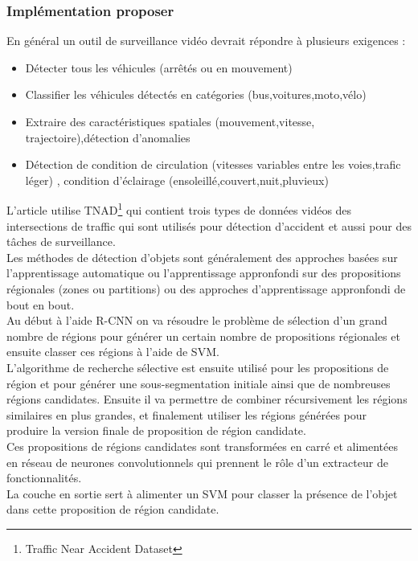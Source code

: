 \documentclass[french,a4paper,11pt,oneside]{article}
\begin{document}
{{ 	 		\subsubsection{Implémentation proposer}{
 	 			En général un outil de surveillance vidéo devrait répondre à plusieurs exigences : \\
 	 			\begin{itemize}
 	 				\item Détecter tous les véhicules (arrêtés ou en mouvement)
 	 				\item Classifier les véhicules détectés en catégories (bus,voitures,moto,vélo)
 	 				\item Extraire des caractéristiques spatiales (mouvement,vitesse, trajectoire),détection d'anomalies
 	 				\item Détection de condition de circulation (vitesses variables entre les voies,trafic léger) , condition d'éclairage (ensoleillé,couvert,nuit,pluvieux)
 	 			\end{itemize}
  				L'article utilise TNAD\footnote{Traffic Near Accident Dataset} qui contient trois types de données vidéos des intersections de traffic qui sont utilisés pour détection d'accident et aussi pour des tâches de surveillance.\\
  				
  				Les méthodes de détection d'objets sont généralement des approches basées sur l'apprentissage automatique ou l'apprentissage appronfondi sur des propositions régionales (zones ou partitions) ou des approches d'apprentissage appronfondi de bout en bout.\\
  				
  				Au début à l'aide R-CNN on va résoudre le problème de sélection d'un grand nombre de régions pour générer un certain nombre de propositions régionales et ensuite classer ces régions à l'aide de SVM.\\
  				
  				L'algorithme de recherche sélective est ensuite utilisé pour les propositions de région et pour générer une sous-segmentation initiale ainsi que de nombreuses régions candidates. Ensuite il va permettre de combiner récursivement les régions similaires en plus grandes, et finalement utiliser les régions générées pour produire la version finale  de proposition de région candidate.\\
  				
  				Ces propositions de régions candidates sont transformées en carré et alimentées en réseau de neurones convolutionnels qui prennent le rôle d'un extracteur de fonctionnalités.\\
  				La couche en sortie sert à alimenter un SVM pour classer la présence de l'objet dans cette proposition de région candidate.\\
  				
}}}
\end{document}
